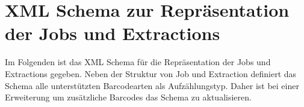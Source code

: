 \chapter{XML Schema zur Repräsentation der Jobs und Extractions}
\writtenby{\dcauthornameewie}%
Im Folgenden ist das XML Schema für die Repräsentation der Jobs und Extractions gegeben.
Neben der Struktur von Job und Extraction definiert das Schema alle unterstützten Barcodearten als Aufzählungstyp.
Daher ist bei einer Erweiterung um zusätzliche Barcodes das Schema zu aktualisieren.


